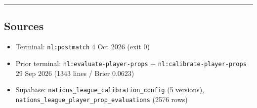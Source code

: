 \documentclass[
]{article}
\providecommand{\tightlist}{%
  \setlength{\itemsep}{0pt}\setlength{\parskip}{0pt}}
\begin{document}
\begin{center}\rule{0.5\linewidth}{0.5pt}\end{center}

\subsection{Sources}\label{sources}

\begin{itemize}
\tightlist
\item
  Terminal: \texttt{nl:postmatch} 4 Oct 2026 (exit 0)
\item
  Prior terminal: \texttt{nl:evaluate-player-props} +
  \texttt{nl:calibrate-player-props} 29 Sep 2026 (1343 lines / Brier
  0.0623)
\item
  Supabase: \texttt{nations\_league\_calibration\_config} (5 versions),
  \texttt{nations\_league\_player\_prop\_evaluations} (2576 rows)
\end{itemize}
\end{document}

